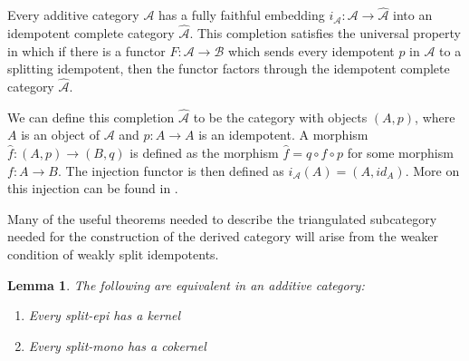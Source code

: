 \documentclass[11pt]{article}
\newtheorem{lemma}[theorem]{Lemma}
\theoremstyle{definition}
\theoremstyle{remark}
\begin{document}
            Every additive category $\mathcal{A}$ has a fully faithful embedding $i_{\mathcal{A}}:\mathcal{A}\rightarrow \widehat{\mathcal{A}}$ into an idempotent complete category $\widehat{\mathcal{A}}$. This completion satisfies the universal property in which if there is a functor $F:\mathcal{A}\rightarrow\mathcal{B}$ which sends every idempotent $p$ in $\mathcal{A}$ to a splitting idempotent, then the functor factors through the idempotent complete category $\widehat{\mathcal{A}}$.

            \begin{center}
            \end{center}

            We can define this completion $\widehat{\mathcal{A}}$ to be the category with objects $(A,p)$, where $A$ is an object of $\mathcal{A}$ and $p:A\rightarrow A$ is an idempotent. A morphism $\widehat{f}:(A,p)\rightarrow (B,q)$ is defined as the morphism $\widehat{f} = q \circ f \circ p$ for some morphism $f:A\rightarrow B$. The injection functor is then defined as $i_{\mathcal{A}}(A)=(A,id_A)$. More on this injection can be found in \cite{buhler}.
            
            Many of the useful theorems needed to describe the triangulated subcategory needed for the construction of the derived category will arise from the weaker condition of weakly split idempotents.

            \begin{lemma}
                The following are equivalent in an additive category:
                \begin{enumerate}
                    \item Every split-epi has a kernel
                    \item Every split-mono has a cokernel
                \end{enumerate}
            \end{lemma}
\end{document}
